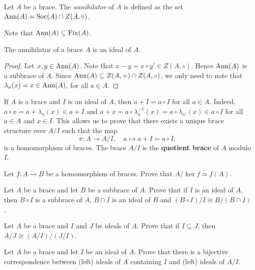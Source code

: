 \begin{definition}
Let $A$ be a brace. The \emph{annihilator} of $A$ is 
defined as the set $\operatorname{Ann}(A)=\operatorname{Soc}(A)\cap Z(A,\circ)$. 
\end{definition}

Note that $\operatorname{Ann}(A)\subseteq\operatorname{Fix}(A)$. 

\begin{proposition}
The annihilator of a brace $A$ is an ideal of $A$. 
\end{proposition}

\begin{proof}
    Let $x,y\in\operatorname{Ann}(A)$. Note that $x-y=x\circ y'\in Z(A,\circ)$. Hence $\operatorname{Ann}(A)$ is a subbrace of $A$. Since $\operatorname{Ann}(A)\subseteq Z(A,+)\cap Z(A,\circ)$, 
    we only need to note that $\lambda_a(x)=x\in\operatorname{Ann}(A)$, for all $a\in A$. 
\end{proof}




If $A$ is a brace and $I$ is an ideal of $A$, then $a+I=a\circ I$ for all $a\in A$. Indeed, 
$a\circ x=a+\lambda_a(x)\in a+I$ and 
$a+x=a\circ\lambda_a^{-1}(x)=a\circ\lambda_{a'}(x)\in a\circ I$ 
for all $a\in A$ and $x\in I$. 
This allows us to prove that there exists a unique brace structure over $A/I$ such that
the map 
\[
\pi\colon A\to A/I,
\quad
a\mapsto a+I=a\circ I,
\]
is a homomorphism of braces. The brace $A/I$ 
is the \textbf{quotient brace} of $A$ modulo $I$. 

\begin{exercise}
\label{xca:iso1}
    Let $f\colon A\to B$ be a homomorphism of braces. Prove that $A/\ker f\simeq f(A)$. 
\end{exercise}

\begin{exercise}
\label{xca:iso2}
    Let $A$ be a brace and let $B$ be a subbrace of $A$. Prove that if $I$ is an ideal of $A$, 
    then $B\circ I$ is a subbrace of $A$, 
    $B\cap I$ is an ideal of $B$ and $(B\circ I)/I\cong B/(B\cap I)$. 
\end{exercise}

\begin{exercise}
\label{xca:iso3}
Let $A$ be a brace and $I$ and $J$ be ideals of $A$. Prove that if $I\subseteq J$, then
$A/J\cong (A/I)/(J/I)$. 
\end{exercise}

\begin{exercise}
\label{xca:correspondence}
Let $A$ be a brace and let $I$ be an ideal of $A$. Prove that there is a bijective correspondence between (left) ideals 
of $A$ containing $I$ and (left) ideals of $A/I$. 
\end{exercise}




